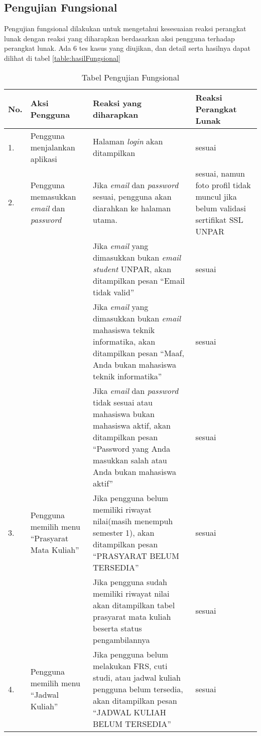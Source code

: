 			\subsection{Pengujian Fungsional} 
			Pengujian fungsional dilakukan untuk mengetahui kesesuaian reaksi perangkat lunak dengan reaksi yang diharapkan berdasarkan aksi pengguna terhadap perangkat lunak. Ada 6 tes kasus yang diujikan, dan detail serta hasilnya dapat dilihat di tabel \ref{table:hasilFungsional}
			
			\begin{table}[H]
			\centering
			\caption{Tabel Pengujian Fungsional}
				\begin{tabular}{|p{0.5cm}| p{4cm}| p{7cm}| p{1.75cm}|} \hline
				No.	&	Aksi Pengguna	&	Reaksi yang diharapkan	&	Reaksi Perangkat Lunak \\ \hline
				1.	&	Pengguna menjalankan aplikasi	&	Halaman \textit{login} akan ditampilkan	&	sesuai	\\ \hline
				2.	&	Pengguna memasukkan \textit{email} dan \textit{password}	&	Jika \textit{email} dan \textit{password}	sesuai, pengguna akan diarahkan ke halaman utama. & sesuai, namun foto profil tidak muncul jika belum validasi sertifikat SSL UNPAR\\ \hline
					&	&	Jika \textit{email} yang dimasukkan bukan \textit{email} \textit{student} UNPAR, akan ditampilkan pesan ``Email tidak valid''&	sesuai	\\ \hline
					&	&	Jika \textit{email} yang dimasukkan bukan \textit{email} mahasiswa teknik informatika, akan ditampilkan pesan ``Maaf, Anda bukan mahasiswa teknik informatika''	&	sesuai	\\ \hline
					&	&	Jika \textit{email} dan \textit{password} tidak sesuai atau mahasiswa bukan mahasiswa aktif, akan ditampilkan pesan ``Password yang Anda masukkan salah atau Anda bukan mahasiswa aktif''	&	sesuai	\\ \hline
				3.	&	Pengguna memilih menu ``Prasyarat Mata Kuliah'' &	Jika pengguna belum memiliki riwayat nilai(masih menempuh semester 1), akan ditampilkan pesan ``PRASYARAT BELUM TERSEDIA''	&	sesuai	\\ \hline
					&	&	Jika pengguna sudah memiliki riwayat nilai	akan ditampilkan tabel prasyarat mata kuliah beserta status pengambilannya &	sesuai	\\ \hline
				4.	&	Pengguna memilih menu ``Jadwal Kuliah'' &	Jika pengguna belum melakukan FRS, cuti studi, atau jadwal kuliah pengguna belum tersedia, akan ditampilkan pesan ``JADWAL KULIAH BELUM TERSEDIA''	&	sesuai	\\ \hline

\end{tabular}
\end{table}
